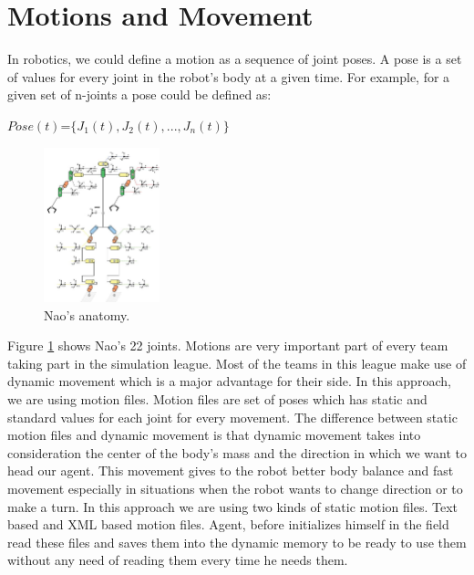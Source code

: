 \section{Motions and Movement}
\label{Motions}
In robotics, we could define a motion as a sequence of joint poses. A pose is a set of values for every joint in the robot's body at a given time.
For example, for a given set of n-joints a pose could be defined as:\\
\begin{center}
$Pose(t)$=$\lbrace J_{1}(t),J_{2}(t),...,J_{n}(t) \rbrace$\\
\end{center}
\begin{figure}[htb!]
\centering
  \includegraphics[width=0.3\textwidth]{Chapter3/figures/Models_NaoAnatomy.png}
  \caption{Nao's anatomy.}
  \label{fig:NaoAnatomy}
\end{figure}
Figure \ref{fig:NaoAnatomy} shows Nao's 22 joints.
Motions are very important part of every team taking part in the simulation league. Most of the teams in this league make use of dynamic movement which is a major advantage for their side. In this approach, we are using motion files. Motion files are set of poses which has static and standard values for each joint for every movement. The difference between static motion files and dynamic movement is that dynamic movement takes into consideration the center of the body's mass and the direction in which we want to head our agent. This movement gives to the robot better body balance and fast movement especially in situations when the robot wants to change direction or to make a turn. In this approach we are using two kinds of static motion files. Text based and XML based motion files. Agent, before initializes himself in the field read these files and saves them into the dynamic memory to be ready to use them without any need of reading them every time he needs them.



